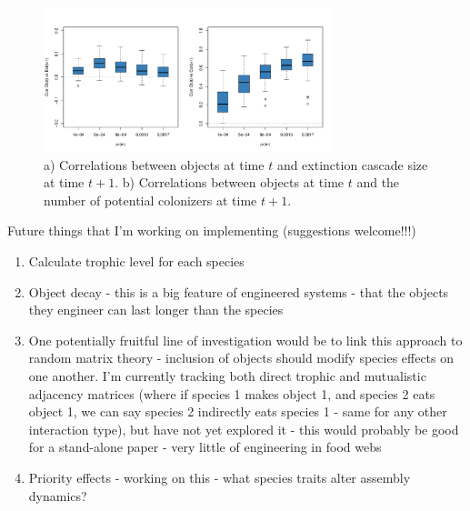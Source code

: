 \documentclass[twocolumn,preprintnumbers,amsmath,amssymb,superscriptaddress]{revtex4}
\begin{document}
\begin{figure}[ht]
\centering
\includegraphics[width=0.75\textwidth]{fig_corrobext_tl2S.pdf}
\caption{
a) Correlations between objects at time $t$ and extinction cascade size at time $t+1$. b) Correlations between objects at time $t$ and the number of potential colonizers at time $t+1$.
}
\label{fig_corrobext}
\end{figure} 


Future things that I'm working on implementing (suggestions welcome!!!)
\begin{enumerate}
\item Calculate trophic level for each species
\item Object decay - this is a big feature of engineered systems - that the objects they engineer can last longer than the species
\item One potentially fruitful line of investigation would be to link this approach to random matrix theory - inclusion of objects should modify species effects on one another. I'm currently tracking both direct trophic and mutualistic adjacency matrices (where if species 1 makes object 1, and species 2 eats object 1, we can say species 2 indirectly eats species 1 - same for any other interaction type), but have not yet explored it - this would probably be good for a stand-alone paper - very little of engineering in food webs
\item Priority effects - working on this - what species traits alter assembly dynamics?
\end{enumerate}
\end{document}
